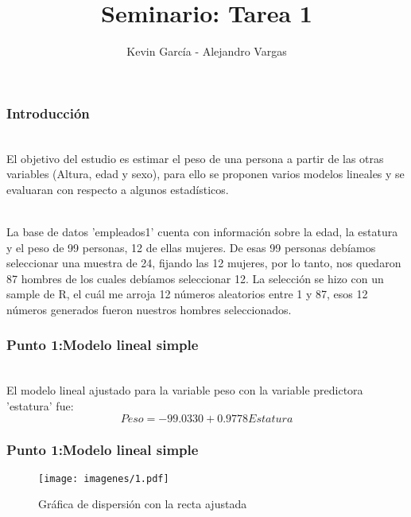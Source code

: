 \documentclass[12pt]{beamer}
\author{Kevin García - Alejandro Vargas}
\title{Seminario: Tarea 1}
\begin{document}
\begin{frame}
\titlepage
\end{frame}

\begin{frame}
\frametitle{Introducción}
~\\El objetivo del estudio es estimar el peso de una persona a partir de las otras variables (Altura, edad y
sexo), para ello se proponen varios modelos lineales y se evaluaran con respecto a algunos estadísticos.

~\\La base de datos 'empleados1' cuenta con información sobre la edad, la estatura y el peso
de 99 personas, 12 de ellas mujeres. De esas 99 personas debíamos seleccionar una muestra de 24, fijando las 12 mujeres, por lo tanto, nos quedaron 87 hombres de los cuales debíamos seleccionar 12. La selección se hizo con un sample de R, el cuál me arroja 12 números aleatorios entre 1 y 87, esos 12 números generados fueron nuestros hombres seleccionados.
\end{frame}

\begin{frame}
\frametitle{Punto 1:Modelo lineal simple}
~\\ El modelo lineal ajustado para la variable peso con la variable predictora 'estatura' fue:
~\\ $$Peso=-99.0330+0.9778 Estatura$$
\end{frame}
\begin{frame}
\frametitle{Punto 1:Modelo lineal simple}
\begin{figure}[!h]
    \begin{center}
        \texttt{[image: imagenes/1.pdf]}
        \caption{Gráfica de dispersión con la recta ajustada}
        \label{fig:Densidad}
    \end{center}
\end{figure}
\end{frame}
\end{document}
